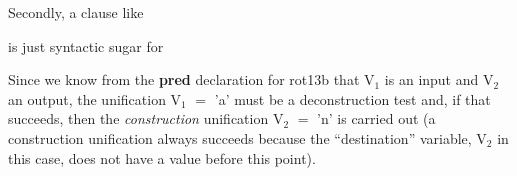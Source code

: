 \documentclass[a4paper,11pt,notitlepage,onecolumn]{book}
\begin{document}
Secondly, a clause like
\begin{small}

\begin{ptabular}
\nextline
\end{ptabular}

\end{small}
is just syntactic sugar for
\begin{small}

\begin{ptabular}
\nextline
\end{ptabular}

\end{small}
Since we know from the \textsf{\textbf{pred}} declaration for \textsf{rot13b} that \textsf{V$_{1}$} is an
input and \textsf{V$_{2}$} an output, the unification \textsf{V$_{1}$ {\ensuremath{=}} 'a'} must be a
deconstruction test and, if that succeeds, then the \emph{construction}
unification \textsf{V$_{2}$ {\ensuremath{=}} 'n'} is carried out (a construction unification always
succeeds because the ``destination'' variable, \textsf{V$_{2}$} in this case, does not
have a value before this point).
\end{document}
